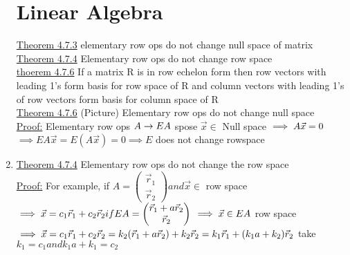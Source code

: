 \documentclass[12pt]{amsart}
\begin{document}
\begin{enumerate}
\section*{Linear Algebra}
\underline{Theorem 4.7.3} elementary row ops do not change null space of matrix\\
\underline{Theorem 4.7.4} Elementary row ops do not change row space\\
\underline{thoerem 4.7.6} If a matrix R is in row echelon form then row vectors with leading 1's form basis for row space of R and column vectors with leading 1's of row vectors form basis for column space of R\\
\underline{Theorem 4.7.6} (Picture)
Elementary row ops do not change null space\\
\underline{Proof:} Elementary row ops $A \rightarrow EA\\$
spose $\vec{x} \in$ Null space $\implies A \vec{x} = 0\\$
$\implies E A \vec{x} = E(A \vec{x}) = 0 \implies E$ does not change rowspace\\
\item \underline{Theorem 4.7.4} Elementary row ops do not change the row space\\
\underline{Proof:} For example, if $A = \begin{pmatrix} \vec{r}_1 \\ \vec{r}_2 \end{pmatrix} and \vec{x} \in$ row space\\
$\implies \vec{x} = c_1 \vec{r}_1 + c_2 \vec{r}_2 if EA = \begin{pmatrix} \vec{r}_1 + a \vec{r}_2 \\ \vec{r}_2 \end{pmatrix}\\
\implies \vec{x} \in EA$ row space\\
$\implies \vec{x} = c_1 \vec{r}_1 + c_2 \vec{r}_2 = k_2(\vec{r}_1 + a \vec{r}_2) + k_2 \vec{r}_2\\
= k_1 \vec{r}_1 + (k_1 a+ k_2) \vec{r}_2$ take $k_1 = c_1 and k_1 a + k_1 = c_2$


\hdashrule[0.5ex][c]{\linewidth}{0.5pt}{1.5mm}



\end{enumerate}
\end{document}
